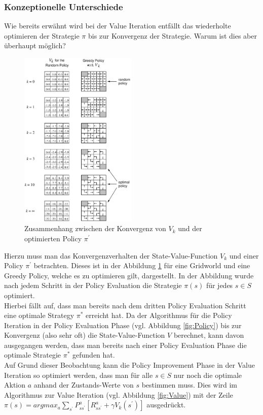 \documentclass[10pt]{scrartcl}
\begin{document}
\subsubsection{Konzeptionelle Unterschiede}
Wie bereits erwähnt wird bei der Value Iteration entfällt das wiederholte optimieren der Strategie $\pi$ bis zur Konvergenz der Strategie.
Warum ist dies aber überhaupt möglich?\\

\begin{figure}[htbp]
	\centering	\includegraphics[width=0.5\textwidth]{Bilder/KonvergenzVkPolicy}
	\caption{Zusammenhang zwischen der Konvergenz von $V_{k}$ und der optimierten Policy $\pi^{'}$ }
	\label{fig:konvergenz}
\end{figure}

Hierzu muss man das Konvergenzverhalten der State-Value-Function $V_{k}$ und einer Policy $\pi^{'}$ betrachten.
Dieses ist in der Abbildung \ref{fig:konvergenz} für eine Gridworld und eine Greedy Policy, welche es zu optimieren gilt, dargestellt.
In der Abbildung wurde nach jedem Schritt in der Policy Evaluation die Strategie $\pi(s)$ für jedes $s \in S$ optimiert.\\
Hierbei fällt auf, dass man bereits nach dem dritten Policy Evaluation Schritt eine optimale Strategy $\pi^{*}$ erreicht hat. 
Da der Algorithmus für die Policy Iteration in der Policy Evaluation Phase (vgl. Abbildung \ref{fig:Policy}) bis zur Konvergenz (also sehr oft) die State-Value-Function $V$ berechnet, kann davon ausgegangen werden, dass man bereits nach einer Policy Evaluation Phase die optimale Strategie $\pi^{*}$ gefunden hat.\\
Auf Grund dieser Beobachtung kann die Policy Improvement Phase in der Value Iteration so optimiert werden, dass man für alle $s \in S$ nur noch die optimale Aktion $a$ anhand der Zustands-Werte von $s$ bestimmen muss.
Dies wird im Algorithmus zur Value Iteration (vgl. Abbildung \ref{fig:Value}) mit der Zeile $\pi(s) = argmax_{a} \sum_{s^{'}} P^a_{ss^{'}} [R^a_{ss^{'}} + \gamma V_{k} (s^{'})]$ ausgedrückt.\\
\end{document}
